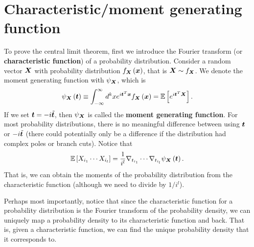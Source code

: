 \section{Characteristic/moment generating function}

To prove the central limit theorem, first we introduce 
the Fourier transform (or \textbf{characteristic function}) of
a probability distribution. 
Consider a random vector ${\bm X}$ with probability distribution 
$f_{{\bm X}}\left({\bm x}\right)$, that is ${\bm X}\sim f_{{\bm X}}$. 
We denote the moment generating function with $\psi_{{\bm X}}$, which is
\begin{align}
    \label{eq:moment-generating-function-def}
    \psi_{{\bm X}}\left({\bm t}\right)
    \equiv
    \int_{-\infty}^{\infty} d^kx e^{i{\bm t}^T{\bm x}} f_{{\bm X}}\left({\bm x}\right)
    = 
    \mathbb{E}\left[e^{i{\bm t}^T {\bm X}}\right] 
    .
\end{align}
If we set ${\bm t} = -i \tilde{{\bm t}}$, then $\psi_{{\bm X}}$ is called the
\textbf{moment generating function}.
For most probability distributions, there is no meaningful difference between
using ${\bm t}$ or $-i\tilde{{\bm t}}$ (there could potentially only be a difference 
if the distribution had complex poles or branch cuts).
Notice that
\begin{align}
    \mathbb{E}\left[X_{i_1}\cdots X_{i_l}\right]
    =
    \frac{1}{i^l}
    \nabla_{t_{i_1}}\cdots\nabla_{t_{i_l}}\psi_{{\bm X}}\left({\bm t}\right)
    .
\end{align}
That is, we can obtain the moments of the probability distribution from the
characteristic function (although we need to divide by $1/i^l$).

Perhaps most importantly, notice that since the characteristic function
for a probability distribution is the Fourier transform of the probability density,
we can uniquely map a probability density to its characteristic function and back.
That is, given a characteristic function, we can find the unique probability
density that it corresponds to.

